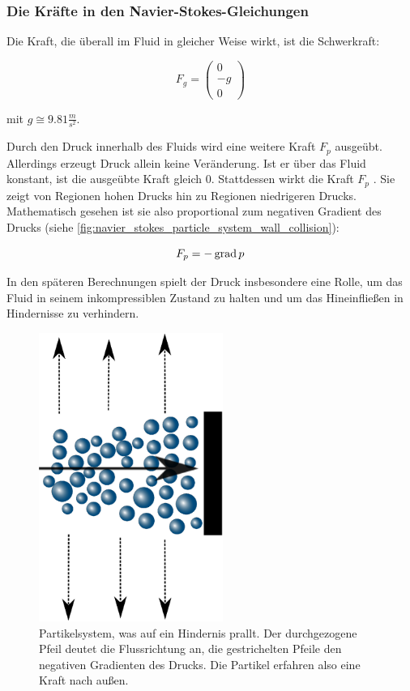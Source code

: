 \subsubsection{Die Kräfte in den Navier-Stokes-Gleichungen}

Die Kraft, die überall im Fluid in gleicher Weise wirkt, ist die Schwerkraft:

\begin{equation}
F_g =
\left(
\begin{array}{c}
0 \\
-g \\
0
\end{array}
\right)
\end{equation}

mit $g \cong 9.81 \frac{m}{s^2}$.

Durch den Druck innerhalb des Fluids wird eine weitere Kraft $F_p$ ausgeübt.
Allerdings erzeugt Druck allein keine Veränderung. Ist er über das Fluid
konstant, ist die ausgeübte Kraft gleich 0. Stattdessen wirkt die Kraft $F_p$
. Sie zeigt von Regionen hohen Drucks hin zu
Regionen niedrigeren Drucks. Mathematisch gesehen ist sie also proportional zum
negativen Gradient des Drucks (siehe
\autoref{fig:navier_stokes_particle_system_wall_collision}):

\begin{equation}
\label{eq:navier_stokes_f_p}
F_p = -\operatorname*{grad} p
\end{equation}

In den späteren Berechnungen spielt der Druck insbesondere eine Rolle, um das
Fluid in seinem inkompressiblen Zustand zu halten und um das Hineinfließen in
Hindernisse zu verhindern.

\begin{figure}[ht]
\includegraphics[width=6cm]{images/particle_system_wall_collision}
\caption{Partikelsystem, was auf ein Hindernis prallt. Der durchgezogene Pfeil deutet die Flussrichtung an, die gestrichelten Pfeile den negativen Gradienten des Drucks. Die Partikel erfahren also eine Kraft nach außen.}
\label{fig:navier_stokes_particle_system_wall_collision}
\end{figure}

